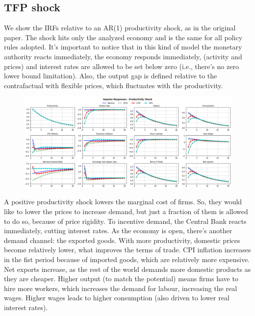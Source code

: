 \documentclass{article}
\begin{document}
\subsection{TFP shock}
We show the IRFs relative to an AR(1) productivity shock, as in the original paper. The shock hits only the analyzed economy and is the same for all policy rules adopted. It's important to notice that in this kind of model the monetary authority reacts immediately, the economy responds immediately, (activity and prices) and interest rates are allowed to be set below zero (i.e., there's no zero lower bound limitation). Also, the output gap is defined relative to the contrafactual with flexible prices, which fluctuates with the productivity.

\begin{figure}[H]
\centering
\includegraphics[width=1\textwidth]{img/Prod_shock_rep.png}
\end{figure}

A positive productivity shock lowers the marginal cost of firms. So, they would like to lower the prices to increase demand, but just a fraction of them is allowed to do so, because of price rigidity. To incentive demand, the Central Bank reacts immediately, cutting interest rates. As the economy is open, there's another demand channel: the exported goods. With more productivity, domestic prices become relatively lower, what improves the terms of trade. CPI inflation increases in the fist period because of imported goods, which are relatively more expensive. Net exports increase, as the rest of the world demands more domestic products as they are cheaper. Higher output (to match the potential) means firms have to hire more workers, which increases the demand for labour, increasing the real wages. Higher wages leads to higher consumption (also driven to lower real interest rates).

\vspace{6pt}
\end{document}
